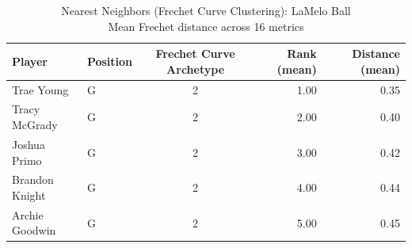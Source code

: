 \begin{table}[t]
\caption*{
{\fontsize{20}{25} Nearest Neighbors (Frechet Curve Clustering): LaMelo Ball\fontsize{12}{15}\selectfont } \\ 
{\fontsize{14}{17}\selectfont  Mean Frechet distance across 16 metrics\fontsize{12}{15}\selectfont }
} 
\fontsize{12.0pt}{14.0pt}\selectfont
\begin{tabular*}{\linewidth}{@{\extracolsep{\fill}}llcrr}
\toprule
Player & Position & Frechet Curve Archetype & Rank (mean) & Distance (mean) \\ 
\midrule\addlinespace[2.5pt]
Trae Young & G & 2 & 1.00 & 0.35 \\ 
Tracy McGrady & G & 2 & 2.00 & 0.40 \\ 
Joshua Primo & G & 2 & 3.00 & 0.42 \\ 
Brandon Knight & G & 2 & 4.00 & 0.44 \\ 
Archie Goodwin & G & 2 & 5.00 & 0.45 \\ 
\bottomrule
\end{tabular*}
\end{table}


